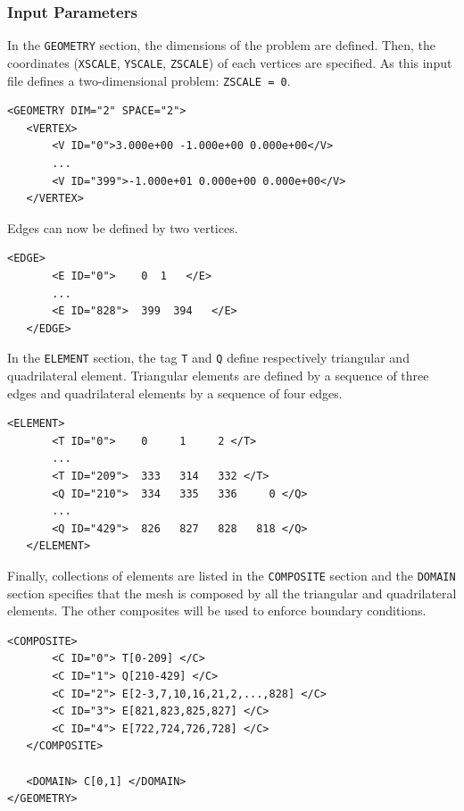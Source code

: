 \subsubsection{Input Parameters}

In the \texttt{GEOMETRY} section, the dimensions of the problem are defined. Then, the coordinates (\texttt{XSCALE}, \texttt{YSCALE}, \texttt{ZSCALE}) of each vertices are specified. As this input file defines a two-dimensional problem: \texttt{ZSCALE = 0}.

      \begin{lstlisting}[style=XMLStyle]
<GEOMETRY DIM="2" SPACE="2">
   <VERTEX>
       <V ID="0">3.000e+00 -1.000e+00 0.000e+00</V>
       ...
       <V ID="399">-1.000e+01 0.000e+00 0.000e+00</V>
   </VERTEX>
     \end{lstlisting}

Edges can now be defined by two vertices.

      \begin{lstlisting}[style=XMLStyle]
<EDGE>
       <E ID="0">    0  1   </E>
       ...
       <E ID="828">  399  394   </E>
   </EDGE>
        \end{lstlisting}

In the \texttt{ELEMENT} section, the tag \texttt{T} and \texttt{Q} define respectively triangular and quadrilateral element. Triangular elements are defined by a sequence of three edges and quadrilateral elements by a sequence of four edges.

      \begin{lstlisting}[style=XMLStyle]
<ELEMENT>
       <T ID="0">    0     1     2 </T>
       ...
       <T ID="209">  333   314   332 </T>
       <Q ID="210">  334   335   336     0 </Q>
       ...
       <Q ID="429">  826   827   828   818 </Q>
   </ELEMENT>
        \end{lstlisting}

Finally, collections of elements are listed in the \texttt{COMPOSITE} section and the \texttt{DOMAIN} section specifies that the mesh is composed by all the triangular and quadrilateral elements. The other composites will be used to enforce boundary conditions.

      \begin{lstlisting}[style=XMLStyle]
<COMPOSITE>
       <C ID="0"> T[0-209] </C>
       <C ID="1"> Q[210-429] </C>
       <C ID="2"> E[2-3,7,10,16,21,2,...,828] </C>
       <C ID="3"> E[821,823,825,827] </C>
       <C ID="4"> E[722,724,726,728] </C>
   </COMPOSITE>
   
   <DOMAIN> C[0,1] </DOMAIN>
</GEOMETRY>
        \end{lstlisting}

